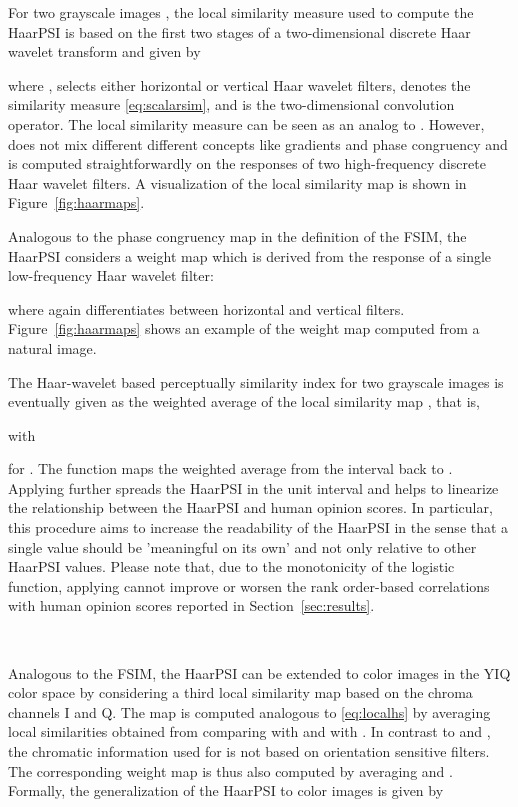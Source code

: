 \documentclass[11pt,a4paper]{article}
\begin{document}
For two grayscale images , the local similarity measure used to compute the HaarPSI is based on the first two stages of a two-dimensional discrete Haar wavelet transform and given by

where ,  selects either horizontal or vertical Haar wavelet filters,  denotes the similarity measure \eqref{eq:scalarsim}, and  is the two-dimensional convolution operator. The local similarity measure  can be seen as an analog to . However,  does not mix different different concepts like gradients and phase congruency and is computed straightforwardly on the responses of two high-frequency discrete Haar wavelet filters. A visualization of the local similarity map  is shown in Figure~\ref{fig:haarmaps}.


Analogous to the phase congruency map  in the definition of the FSIM, the HaarPSI considers a weight map which is derived from the response of a single low-frequency Haar wavelet filter:

where  again differentiates between horizontal and vertical filters. Figure~\ref{fig:haarmaps} shows an example of the weight map  computed from a natural image.


The Haar-wavelet based perceptually similarity index for two grayscale images  is eventually given as the weighted average of the local similarity map  , that is, 

with

for .
The function  maps the weighted average from the interval  back to . Applying  further spreads the HaarPSI in the unit interval and helps to linearize the relationship between the HaarPSI and human opinion scores. In particular, this procedure aims to increase the readability of the HaarPSI in the sense that a single value should be 'meaningful on its own' and not only relative to other HaarPSI values. Please note that, due to the monotonicity of the logistic function, applying  cannot improve or worsen the rank order-based correlations with human opinion scores reported in Section~\ref{sec:results}.

\

Analogous to the FSIM, the HaarPSI can be extended to color images in the YIQ color space by considering a third local similarity map based on the chroma channels I and Q. The map  is computed analogous to \eqref{eq:localhs} by averaging local similarities obtained from comparing  with  and  with . In contrast to  and , the chromatic information used for  is not based on orientation sensitive filters. The corresponding weight map  is thus also computed by averaging  and . Formally, the generalization of the HaarPSI to color images is given by
\end{document}
